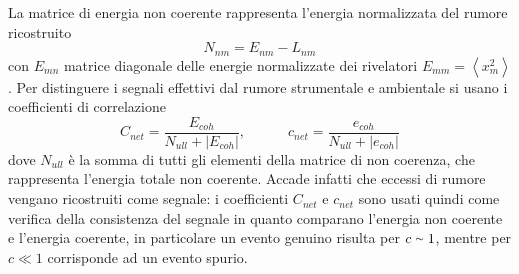 La matrice di energia non coerente rappresenta l'energia normalizzata del rumore ricostruito
\begin{equation}
	N_{nm} = E_{nm}-L_{nm}
\end{equation}
con $E_{mn}$  matrice diagonale delle energie normalizzate dei rivelatori $E_{mm}  = \left<x_m^2\right>$. Per distinguere i segnali effettivi dal rumore strumentale e ambientale si usano i coefficienti di correlazione 
\begin{equation}
	C_{net} = \frac{E_{coh}}{N_{ull}+|E_{coh}|}, \quad\quad\quad c_{net} = \frac{e_{coh}}{N_{ull}+|e_{coh}|}
	\label{eqn:coefficient_energy}
\end{equation}
dove $N_{ull}$ è la somma di tutti gli elementi della matrice di non coerenza, che rappresenta l'energia totale non coerente. Accade infatti che eccessi di rumore vengano ricostruiti come segnale: i coefficienti $C_{net}$ e $c_{net}$ sono usati quindi come verifica della consistenza del segnale in quanto comparano l'energia non coerente e l'energia coerente\cite{Klimenko_2008}, in particolare un evento genuino risulta per $c\smallsim 1$, mentre per $c \ll 1$ corrisponde ad un evento spurio\cite{Klimenko_2016}.






